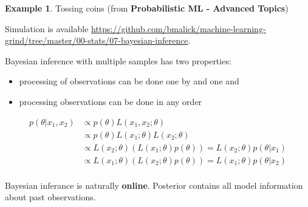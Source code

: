 \documentclass[12pt, a4paper]{article}
\theoremstyle{definition}
\newtheorem{example}{Example}[section]
\numberwithin{figure}{section}
\numberwithin{equation}{section}
\numberwithin{table}{section}
\begin{document}
\begin{example}{Tossing coins (from \textbf{Probabilistic ML - Advanced Topics})}

Simulation is available \url{https://github.com/bmalick/machine-learning-grind/tree/master/00-stats/07-bayesian-inference}.


\end{example}

Bayesian inference with multiple samples has two properties:
\begin{itemize}
    \item processing of observations can be done one by and one and
    \item processing observations can be done in any order
\end{itemize}


\begin{align}
p(\theta | x_1,x_2) 
&\propto p(\theta) L(x_1,x_2 ; \theta)\\
&\propto p(\theta) L(x_1; \theta) L(x_2; \theta)\\
&\propto L(x_2; \theta) (L(x_1; \theta) p(\theta))=L(x_2; \theta) p(\theta|x_1)\\
&\propto L(x_1; \theta) (L(x_2; \theta) p(\theta))=L(x_1; \theta) p(\theta|x_2)\\
\end{align}

Bayesian inferance is naturally \textbf{online}.
Posterior contains all model information about past observations.
\end{document}

